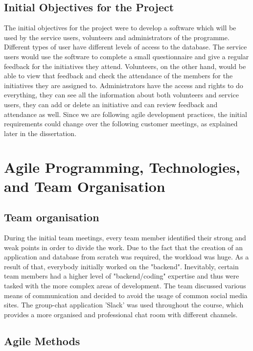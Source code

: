 \documentclass{l3proj}
\begin{document}
\subsection{Initial Objectives for the Project}
\label{objectives}

The initial objectives for the project were to develop a software which will be used by the service users, volunteers and administrators of the programme. Different types of user have different levels of access to the database. The service users would use the software to complete a small questionnaire and give a regular feedback for the initiatives they attend. Volunteers, on the other hand, would be able to view that feedback and check the attendance of the members for the initiatives they are assigned to. Administrators have the access and rights to do everything, they can see all the information about both volunteers and service users, they can add or delete an initiative and can review feedback and attendance as well. Since we are following agile development practices, the initial requirements could change over the following customer meetings, as explained later in the dissertation.

\section{Agile Programming, Technologies, and Team Organisation}

\subsection{Team organisation}
\label{organisation}

During the initial team meetings, every team member identified their strong and weak points in order to divide the work. Due to the fact that the creation of an application and database from scratch was required, the workload was huge. As a result of that, everybody initially worked on the "backend". Inevitably, certain team members had a higher level of "backend/coding" expertise and thus were tasked with the more complex areas of development.
The team discussed various means of communication and decided to avoid the usage of common social media sites. The group-chat application 'Slack' was used throughout the course, which provides a more organised and professional chat room with different channels.

\subsection{Agile Methods}
\label{agile}
\end{document}
